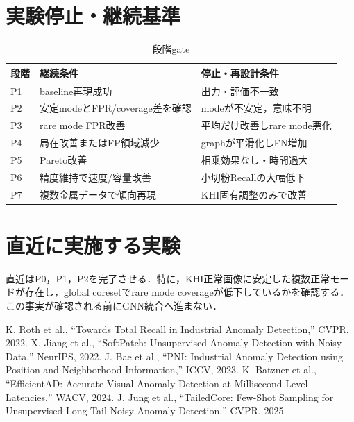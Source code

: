 \documentclass[a4paper,11pt]{ltjsarticle}
\begin{document}
\section{実験停止・継続基準}
\begin{table}[H]
\centering
\caption{段階gate}
\begin{tabularx}{\linewidth}{L{25mm}Y Y}
\toprule
段階 & 継続条件 & 停止・再設計条件 \\
\midrule
P1 & baseline再現成功 & 出力・評価不一致 \\
P2 & 安定modeとFPR/coverage差を確認 & modeが不安定，意味不明 \\
P3 & rare mode FPR改善 & 平均だけ改善しrare mode悪化 \\
P4 & 局在改善またはFP領域減少 & graphが平滑化しFN増加 \\
P5 & Pareto改善 & 相乗効果なし・時間過大 \\
P6 & 精度維持で速度/容量改善 & 小切粉Recallの大幅低下 \\
P7 & 複数金属データで傾向再現 & KHI固有調整のみで改善 \\
\bottomrule
\end{tabularx}
\end{table}

\section{直近に実施する実験}
直近はP0，P1，P2を完了させる．特に，KHI正常画像に安定した複数正常モードが存在し，global coresetでrare mode coverageが低下しているかを確認する．この事実が確認される前にGNN統合へ進まない．

\begin{thebibliography}{99}
 K. Roth et al., ``Towards Total Recall in Industrial Anomaly Detection,'' CVPR, 2022.
 X. Jiang et al., ``SoftPatch: Unsupervised Anomaly Detection with Noisy Data,'' NeurIPS, 2022.
 J. Bae et al., ``PNI: Industrial Anomaly Detection using Position and Neighborhood Information,'' ICCV, 2023.
 K. Batzner et al., ``EfficientAD: Accurate Visual Anomaly Detection at Millisecond-Level Latencies,'' WACV, 2024.
 J. Jung et al., ``TailedCore: Few-Shot Sampling for Unsupervised Long-Tail Noisy Anomaly Detection,'' CVPR, 2025.
\end{thebibliography}
\end{document}
